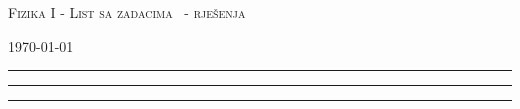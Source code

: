 \documentclass[11pt]{report}
\newcounter{zadatak} %
\newcounter{cjelina}
\begin{document}

\setlength{\textfloatsep}{3pt}  %
\setlength{\intextsep}{3pt}



\textsc{{\LARGE Fizika I - List sa zadacima \thecjelina \  - rješenja}}

{\footnotesize  \today}
\vspace{1.0cm}


\vspace{1.2cm} 


\noindent
{\color{boja} \rule{\linewidth}{0.3mm} }

\vspace{0.8cm} 

\newpage

\noindent
{\color{boja} \rule{\linewidth}{0.3mm} }

\vspace{0.8cm}


\newpage

\noindent
{\color{boja} \rule{\linewidth}{0.3mm} }




%

%

\end{document}

